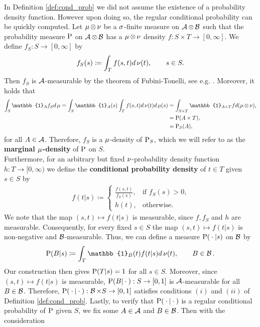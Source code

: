 In Definition \ref{def:cond_prob} we did not assume the existence of a probability density function. However upon doing so, the regular conditional probability can be quickly computed. Let $\operatorname{\mu} \otimes \operatorname{\nu}$ be a $\operatorname{\sigma}$-finite measure on $\operatorname{\mathcal{A}} \otimes \operatorname{\mathcal{B}}$ such that the probability measure $\operatorname{\text{P}}$ on $\operatorname{\mathcal{A}} \otimes \operatorname{\mathcal{B}}$ has a $\operatorname{\mu} \otimes \operatorname{\nu}$ density $f: S \times T \to  [0, \infty]$. We define $f_S: S \to [0, \infty]$ by
\begin{align*}
f_S(s) \coloneqq \int_{T} f(s, t) d\operatorname{\nu}(t),\qquad s\in S.
\end{align*}
Then $f_S$ is $\operatorname{\mathcal{A}}$-measurable by the theorem of Fubini-Tonelli, see e.g. \cite[Theorem~14.16]{klenke2013probability}. Moreover, it holds that
\begin{align*}
\int_{S}\mathbb{1}_Af_Sd\m = \int_S \mathbb{1}_A(s)\int_Tf(s,t)d\n(t)d\m(s) &= \int_{S \times T}\mathbb{1}_{A\times T} f d (\m \otimes \n),\\
&= \prob(A\times T),\\
&= \prob_S(A),
\end{align*}
for all $A\in\operatorname{\mathcal{A}}$. Therefore, $f_S$ is a $\operatorname{\mu}$-density of $\operatorname{\text{P}}_S$, which we will refer to as the \textbf{marginal $\operatorname{\mu}$-density} of $\operatorname{\text{P}}$ on $S$.\\
Furthermore, for an arbitrary but fixed $\operatorname{\nu}$-probability density function $h:T\to [0,\infty)$ we define the \textbf{conditional probability density} of $t\in T$ given $s\in S$ by
\begin{align*}
f(t|s) \coloneqq \begin{cases}
\frac{f(s, t)}{f_S(s)}, 	&\text{if $f_S(s)>0$,}\\
h(t), 						&\text{otherwise}.
\end{cases}
\end{align*}
We note that the map $(s,t) \mapsto f(t|s)$ is measurable, since $f, f_S$ and $h$ are measurable. Consequently, for every fixed $s\in S$ the map $(s,t) \mapsto f(t|s)$ is non-negative and $\operatorname{\mathcal{B}}$-measurable. Thus, we can define a measure $\operatorname{\text{P}}({}\cdot{}|s)$ on $\operatorname{\mathcal{B}}$ by
\begin{align*}
\prob(B|s) \coloneqq \int_{T} \mathbb{1}_B(t) f(t|s)d\n(t), \qquad B\in\B.
\end{align*}
Our construction then gives $\operatorname{\text{P}}(T|s) = 1$ for all $s\in S$. Moreover, since $(s,t) \mapsto f(t|s)$ is measurable, $\operatorname{\text{P}}(B|{}\cdot{}):S\to [0, 1]$ is $\operatorname{\mathcal{A}}$-measurable for all $B\in\operatorname{\mathcal{B}}$. Therefore, $\operatorname{\text{P}}({}\cdot{} |{}\cdot{}):\operatorname{\mathcal{B}}\times S \to [0, 1]$ satisfies conditions $(i)$ and $(ii)$ of Definition \ref{def:cond_prob}. Lastly, to verify that $\operatorname{\text{P}}({}\cdot{} |{}\cdot{})$ is a regular conditional probability of $\operatorname{\text{P}}$ given $S$, we fix some $A\in\operatorname{\mathcal{A}}$ and $B\in\operatorname{\mathcal{B}}$. Then with the consideration
